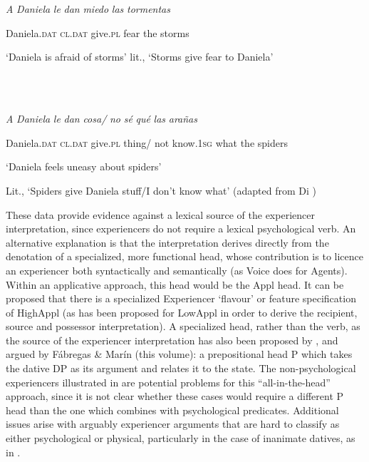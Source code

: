 \documentclass[output=paper,modfonts,nonflat]{langsci/langscibook}
\begin{document}
\ea%
    \label{ex:key:17}
    \gll\\
        \\
    \glt
    \z

           \textit{A} \textit{Daniela}   \textit{le}     \textit{dan}     \textit{miedo}  \textit{las} \textit{tormentas} 

  Daniela.\textsc{dat} \textsc{cl.dat} give.\textsc{pl}  fear  the storms 

  ‘Daniela is afraid of storms’ lit., ‘Storms give fear to Daniela’

\ea%
    \label{ex:key:18}
    \gll\\
        \\
    \glt
    \z

           \textit{A} \textit{Daniela} \textit{le}   \textit{dan} \textit{cosa/}   \textit{no} \textit{sé} \textit{qué} \textit{las} \textit{arañas} 

  Daniela.\textsc{dat}   \textsc{cl.dat} give.\textsc{pl} thing/ not know.1\textsc{sg} what the spiders 

  ‘Daniela feels uneasy about spiders’ 

  Lit., ‘Spiders give Daniela stuff/I don’t know what’ (adapted from Di   \citealt{Tullio2015})

These data provide evidence against a lexical source of the experiencer interpretation, since experiencers do not require a lexical psychological verb. An alternative explanation is that the interpretation derives directly from the denotation of a specialized, more functional head, whose contribution is to licence an experiencer both syntactically and semantically (as Voice does for Agents). Within an applicative approach, this head would be the Appl head. It can be proposed that there is a specialized Experiencer ‘flavour’ or feature specification of HighAppl (as has been proposed for LowAppl in order to derive the recipient, source and possessor interpretation). A specialized head, rather than the verb, as the source of the experiencer interpretation has also been proposed by \citet{Landau2010}, and argued by Fábregas \& Marín (this volume): a prepositional head P which takes the dative DP as its argument and relates it to the state. The non-psychological experiencers illustrated in  are potential problems for this “all-in-the-head” approach, since it is not clear whether these cases would require a different P head than the one which combines with psychological predicates. Additional issues arise with arguably experiencer arguments that are hard to classify as either psychological or physical, particularly in the case of inanimate datives, as in .   
\end{document}
